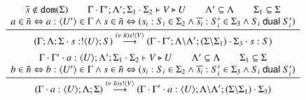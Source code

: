 \begin{figure}
	\[
	\begin{array}{c}
		\tree{
			\begin{array}{c}
				\dual{s} \notin \dom{\Sigma}
				\qquad 
				\Gamma \cat \Gamma'; \Lambda'; \Sigma_1 \cat \Sigma_2 \proves V \hastype U
				\qquad
				\Lambda' \subseteq \Lambda
				\qquad
				\Sigma_1 \subseteq \Sigma\\
				a \in \tilde{n} \Leftrightarrow a: \chtype{U'} \in \Gamma \wedge
				s \in \tilde{n} \Leftrightarrow (s_i: S_i \in \Sigma_2 \wedge \dual{s_i}: S'_i \in \Sigma_3 \wedge S_i \dualof S'_i)
			\end{array}
		}{
			(\Gamma; \Lambda; \Sigma \cat s: \btout{U} S) \by{\news{\tilde{n}} \bactout{s}{V}} (\Gamma \cat \Gamma'; \Lambda\backslash\Lambda'; (\Sigma\backslash\Sigma_1) \cat \Sigma_3 \cat s: S)			
		}
		\\[6mm]
		\tree{
			\begin{array}{c}
				\Gamma \cat \Gamma' \cat a: \chtype{U}; \Lambda'; \Sigma_1 \cat \Sigma_2 \proves V \hastype U
				\qquad
				\Lambda' \subseteq \Lambda
				\qquad
				\Sigma_1 \subseteq \Sigma\\
				b \in \tilde{n} \Leftrightarrow b: \chtype{U'} \in \Gamma \wedge
				s \in \tilde{n} \Leftrightarrow (s_i: S_i \in \Sigma_2 \wedge \dual{s_i}: S'_i \in \Sigma_3 \wedge S_i \dualof S'_i)
			\end{array}
		}{
			(\Gamma\cat a: \chtype{U}; \Lambda; \Sigma) \by{\news{\tilde{n}} \bactout{s}{V}} (\Gamma \cat \Gamma'\cat a: \chtype{U}; \Lambda\backslash\Lambda'; (\Sigma\backslash\Sigma_1) \cat \Sigma_3)			
		}
		\\[6mm]



\end{array}\]
\end{figure}
